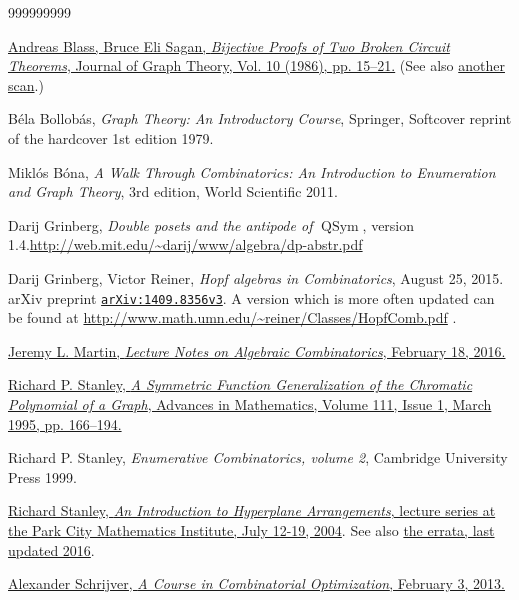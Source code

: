 \documentclass[numbers=enddot,12pt,final,onecolumn,notitlepage]{scrartcl}%
\theoremstyle{definition}
\begin{document}
\begin{thebibliography}{999999999}                                                                                        %


%
\href{http://users.math.msu.edu/users/sagan/Papers/Old/bpt.pdf}{Andreas Blass,
Bruce Eli Sagan, \textit{Bijective Proofs of Two Broken Circuit Theorems},
Journal of Graph Theory, Vol. 10 (1986), pp. 15--21.} (See also
\href{https://www.math.ucdavis.edu/~deloera/MISC/BIBLIOTECA/trunk/Sagan2.pdf}{another
scan}.)

B\'{e}la Bollob\'{a}s, \textit{Graph Theory: An
Introductory Course}, Springer, Softcover reprint of the hardcover 1st edition 1979.

Mikl\'{o}s B\'{o}na, \textit{A Walk Through
Combinatorics: An Introduction to Enumeration and Graph Theory}, 3rd edition,
World Scientific 2011.

Darij Grinberg, \textit{Double posets and the
antipode of }$\operatorname*{QSym}$, version 1.4.\newline\url{http://web.mit.edu/~darij/www/algebra/dp-abstr.pdf}

Darij Grinberg, Victor Reiner, \textit{Hopf algebras
in Combinatorics}, August 25, 2015. arXiv preprint
\href{http://www.arxiv.org/abs/1409.8356v3}{\texttt{arXiv:1409.8356v3}}.
\newline A version which is more often updated can be found at
\url{http://www.math.umn.edu/~reiner/Classes/HopfComb.pdf} .

%
\href{https://www.math.ku.edu/~jmartin/LectureNotes.pdf}{Jeremy L. Martin,
\textit{Lecture Notes on Algebraic Combinatorics}, February 18, 2016.}

%
\href{http://www.sciencedirect.com/science/article/pii/S0001870885710201}{Richard
P. Stanley, \textit{A Symmetric Function Generalization of the Chromatic
Polynomial of a Graph}, Advances in Mathematics, Volume 111, Issue 1, March
1995, pp. 166--194.}

Richard P. Stanley, \textit{Enumerative
Combinatorics, volume 2}, Cambridge University Press 1999.

%
\href{http://www-math.mit.edu/~rstan/arrangements/arr.html}{Richard Stanley,
\textit{An Introduction to Hyperplane Arrangements}, lecture series at the
Park City Mathematics Institute, July 12-19, 2004}. See also
\href{http://www-math.mit.edu/~rstan/arrangements/errata.pdf}{the errata, last
updated 2016}.

%
\href{http://homepages.cwi.nl/~lex/files/dict.pdf}{Alexander Schrijver,
\textit{A Course in Combinatorial Optimization}, February 3, 2013.}
\end{thebibliography}
\end{document}
